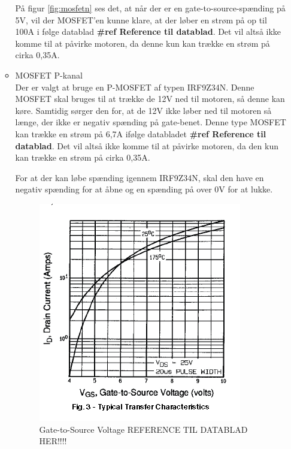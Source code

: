 \begin{itemize}
\begin{itemize}
	På figur \ref{fig:mosfetn} ses det, at når der er en gate-to-source-spænding på 5V, vil der MOSFET'en kunne klare, at der løber en strøm på op til 100A i følge datablad \textbf{\#ref Reference til datablad}. Det vil altså ikke komme til at påvirke motoren, da denne kun kan trække en strøm på cirka 0,35A. 
	
\item MOSFET P-kanal \\
	Der er valgt at bruge en P-MOSFET af typen IRF9Z34N. Denne MOSFET skal bruges til at trække de 12V ned til motoren, så denne kan køre. Samtidig sørger den for, at de 12V ikke løber ned til motoren så længe, der ikke er negativ spænding på gate-benet. 
	Denne type MOSFET kan trække en strøm på 6,7A ifølge databladet \textbf{\#ref Reference til datablad}. Det vil altså ikke komme til at påvirke motoren, da den kun kan trække en strøm på cirka 0,35A. 
	
	For at der kan løbe spænding igennem IRF9Z34N, skal den have en negativ spænding for at åbne og en spænding på over 0V for at lukke. 
	
	\begin{figure}[H]
		\centering
		\includegraphics[width=\textwidth]{DesignOgImplementering/images/grafp}
		\caption{Gate-to-Source Voltage REFERENCE TIL DATABLAD HER!!!!}
		\label{fig:mosfetp}
	\end{figure}
	

\end{itemize}
\end{itemize}
